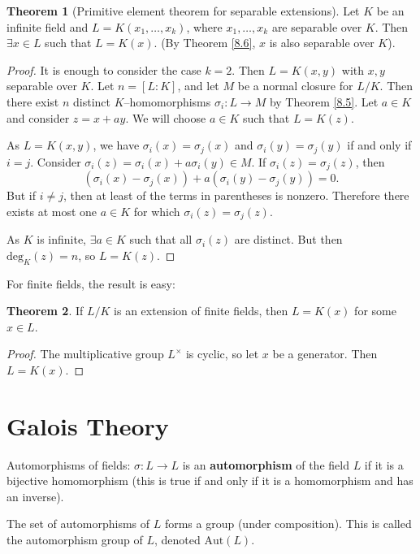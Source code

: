 \documentclass{article}
\theoremstyle{definition}
\newtheorem{theorem}{Theorem}[section]
\begin{document}
\begin{theorem}[Primitive element theorem for separable extensions]
    Let $K$ be an infinite field and $L=K(x_1,\ldots,x_k)$, where $x_1,\ldots,x_k$ are separable over $K$. Then $\exists x \in L$ such that $L=K(x)$. (By Theorem \ref{8.6}, $x$ is also separable over $K$).
\end{theorem}
\begin{proof}
    It is enough to consider the case $k=2$. Then $L=K(x,y)$ with $x,y$ separable over $K$. Let $n=[L:K]$, and let $M$ be a normal closure for $L/K$. Then there exist $n$ distinct $K$--homomorphisms $\sigma_i : L \to M$ by Theorem \ref{8.5}. Let $a \in K$ and consider $z=x+ay$. We will choose $a \in K$ such that $L=K(z)$.

    As $L=K(x,y)$, we have $\sigma_i(x)=\sigma_j(x)$ and $\sigma_i(y)=\sigma_j(y)$ if and only if $i=j$. Consider $\sigma_i(z)=\sigma_i(x) + a \sigma_i(y) \in M$. If $\sigma_i(z)=\sigma_j(z)$, then $$(\sigma_i(x)-\sigma_j(x))+a(\sigma_i(y)-\sigma_j(y))=0.$$ But if $i\neq j$, then at least of the terms in parentheses is nonzero. Therefore there exists at most one $a \in K$ for which $\sigma_i(z)=\sigma_j(z)$.

    As $K$ is infinite, $\exists a \in K$ such that all $\sigma_i(z)$ are distinct. But then $\text{deg}_K(z) = n$, so $L=K(z)$.
\end{proof}
For finite fields, the result is easy:
\begin{theorem}
    If $L/K$ is an extension of finite fields, then $L=K(x)$ for some $x \in L$.
\end{theorem}
\begin{proof}
    The multiplicative group $L^\times$ is cyclic, so let $x$ be a generator. Then $L=K(x)$.
\end{proof}
\section{Galois Theory}
Automorphisms of fields: $\sigma : L \to L$ is an \textbf{automorphism} of the field $L$ if it is a bijective homomorphism (this is true if and only if it is a homomorphism and has an inverse).

The set of automorphisms of $L$ forms a group (under composition). This is called the automorphism group of $L$, denoted $\text{Aut}(L)$.
\end{document}
